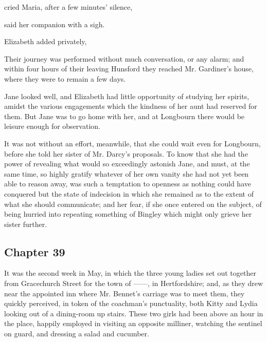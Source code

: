 cried Maria, after a few minutes' silence, 

 said her companion with a sigh.


Elizabeth added privately, 

Their journey was performed without much conversation, or any alarm; and within four hours of their leaving Hunsford they reached Mr. Gardiner's house, where they were to remain a few days.

Jane looked well, and Elizabeth had little opportunity of studying her spirits, amidst the various engagements which the kindness of her aunt had reserved for them. But Jane was to go home with her, and at Longbourn there would be leisure enough for observation.

It was not without an effort, meanwhile, that she could wait even for Longbourn, before she told her sister of Mr. Darcy's proposals. To know that she had the power of revealing what would so exceedingly astonish Jane, and must, at the same time, so highly gratify whatever of her own vanity she had not yet been able to reason away, was such a temptation to openness as nothing could have conquered but the state of indecision in which she remained as to the extent of what she should communicate; and her fear, if she once entered on the subject, of being hurried into repeating something of Bingley which might only grieve her sister further.

\subsection[chapter-39]{\useURL[url39][][][]\from[url39] Chapter 39}

It was the second week in May, in which the three young ladies set out together from Gracechurch Street for the town of ------, in Hertfordshire; and, as they drew near the appointed inn where Mr. Bennet's carriage was to meet them, they quickly perceived, in token of the coachman's punctuality, both Kitty and Lydia looking out of a dining-room up stairs. These two girls had been above an hour in the place, happily employed in visiting an opposite milliner, watching the sentinel on guard, and dressing a salad and cucumber.

